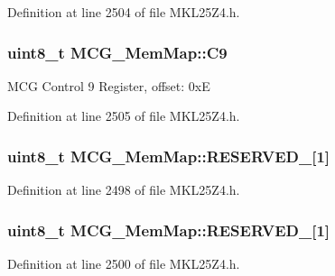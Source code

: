 Definition at line 2504 of file M\+K\+L25\+Z4.\+h.

\subsubsection[{\texorpdfstring{C9}{C9}}]{\setlength{\rightskip}{0pt plus 5cm}uint8\+\_\+t M\+C\+G\+\_\+\+Mem\+Map\+::\+C9}\hypertarget{struct_m_c_g___mem_map_a35982b38fc8c8986c066146537c1c672}{}\label{struct_m_c_g___mem_map_a35982b38fc8c8986c066146537c1c672}
M\+CG Control 9 Register, offset\+: 0xE 

Definition at line 2505 of file M\+K\+L25\+Z4.\+h.

\subsubsection[{\texorpdfstring{R\+E\+S\+E\+R\+V\+E\+D\+\_\+0}{RESERVED_0}}]{\setlength{\rightskip}{0pt plus 5cm}uint8\+\_\+t M\+C\+G\+\_\+\+Mem\+Map\+::\+R\+E\+S\+E\+R\+V\+E\+D\+\_\mbox{[}1\mbox{]}}\hypertarget{struct_m_c_g___mem_map_a4a2bbf23e6c51743e808ba42e79d6128}{}\label{struct_m_c_g___mem_map_a4a2bbf23e6c51743e808ba42e79d6128}


Definition at line 2498 of file M\+K\+L25\+Z4.\+h.

\subsubsection[{\texorpdfstring{R\+E\+S\+E\+R\+V\+E\+D\+\_\+1}{RESERVED_1}}]{\setlength{\rightskip}{0pt plus 5cm}uint8\+\_\+t M\+C\+G\+\_\+\+Mem\+Map\+::\+R\+E\+S\+E\+R\+V\+E\+D\+\_\mbox{[}1\mbox{]}}\hypertarget{struct_m_c_g___mem_map_a612b54d367d5589e35fd249f6335f85c}{}\label{struct_m_c_g___mem_map_a612b54d367d5589e35fd249f6335f85c}


Definition at line 2500 of file M\+K\+L25\+Z4.\+h.

